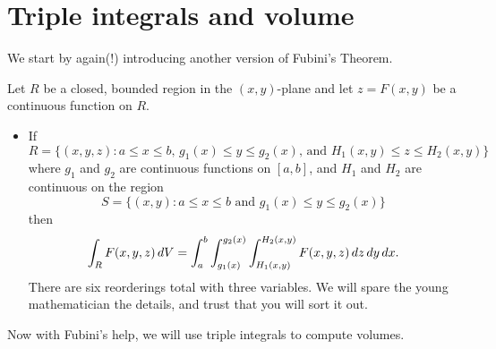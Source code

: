 \documentclass{ximera}
\begin{document}
\section{Triple integrals and volume}

We start by again(!) introducing another version of Fubini's Theorem.

\begin{theorem}[Fubini]
  Let $R$ be a closed, bounded region in the $(x,y)$-plane and let
  $z=F(x,y)$ be a continuous function on $R$.
  \begin{itemize}
  \item If
    \[
    R=\{(x,y,z):\text{$a\leq x\leq b$, $g_1(x)\leq y\leq g_2(x)$, and $H_1(x,y) \leq z \leq H_2(x,y)$}\}
    \]
    where $g_1$ and $g_2$ are continuous functions on $[a,b]$, and $H_1$ and $H_2$ are continuous on the region
    \[
    S =\{(x,y):\text{$a\leq x\leq b$ and $g_1(x)\leq y\leq g_2(x)$}\}
    \]
    then
    \[
    \int_R F(x,y,z) \mathop{}\!d V = \int_a^b\int_{g_1(x)}^{g_2(x)}\int_{H_1(x,y)}^{H_2(x,y)} F(x,y,z)\mathop{}\!d z\mathop{}\!d y\mathop{}\!d x.
    \]
    There are six reorderings total with three variables. We will spare
    the young mathematician the details, and trust that you will sort
    it out.
\end{itemize}
\end{theorem}

Now with Fubini's help, we will use triple integrals to compute
volumes.
\end{document}
